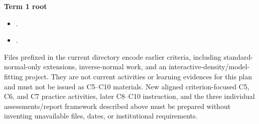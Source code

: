 \documentclass[10pt,letterpaper]{article}
\newcommand{\plansubsection}[1]{\Needspace{7\baselineskip}\par\vspace{5pt}{\normalsize\bfseries #1\par}\vspace{1pt}}
\begin{document}
	\textbf{Term 1 root}
	\begin{itemize}
		\item \href{https://nolopez338.github.io/global_economics/book/grade11/term_1/PGF-02-R39_G11_Global_T1_2026-2027-plain.pdf}{\texttt{}}.
		\item \href{https://nolopez338.github.io/global_economics/book/grade11/term_1/PGF-02-R39_G11_Global_T1_2026-2027.pdf}{\texttt{}}.
	\end{itemize}
	\plansubsection{Legacy-material boundary}
	Files prefixed \textnormal{} in the current directory encode earlier criteria, including standard-normal-only extensions, inverse-normal work, and an interactive-density/model-fitting project. They are not current activities or learning evidences for this plan and must not be issued as C5--C10 materials. New aligned criterion-focused C5, C6, and C7 practice activities, later C8--C10 instruction, and the three individual assessments/report framework described above must be prepared without inventing unavailable files, dates, or institutional requirements.
	
\end{document}
